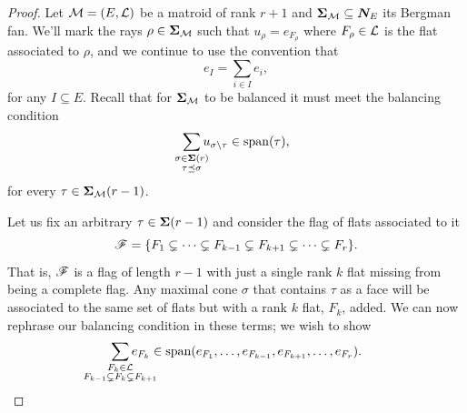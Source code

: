 \documentclass[12pt,oneside]{../../sfsuthesis}
\begin{document}
\begin{proof}
    Let \( \mathcal{M} = (E, \mathcal{L}) \) be a matroid of rank \( r + 1 \) and \( {\bm{\Sigma}}_{\mathcal{M}} \subseteq \bm{N}_E \) its Bergman fan.
    We'll mark the rays \( \rho \in {\bm{\Sigma}}_{\mathcal{M}} \) such that \( u_\rho = e_{F_\rho} \) where \( F_\rho \in \mathcal{L} \) is the flat associated to \( \rho \), and we continue to use the convention that
    \[
        e_{I} = \sum_{i \in I} e_i,
    \]
    for any \( I \subseteq E \).
    Recall that for \( {\bm{\Sigma}}_{\mathcal{M}} \) to be balanced it must meet the balancing condition
    \[
        \sum_{\mathclap{\substack{\sigma \in \bSigma(r) \\ \tau \preceq \sigma}}} u_{\sigma \setminus \tau} \in \Span(\tau),
    \]
    for every \( \tau \in {\bm{\Sigma}}_{\mathcal{M}}(r-1) \).

    Let us fix an arbitrary \( \tau \in {\bm{\Sigma}}(r-1) \) and consider the flag of flats associated to it
    \[
        \mathscr{F} = \{ F_1 \subsetneq \cdots \subsetneq F_{k-1} \subsetneq  F_{k+1} \subsetneq \cdots \subsetneq F_{r} \}.
    \]
    That is, \( \mathscr{F} \) is a flag of length \( r - 1 \) with just a single rank \( k \) flat missing from being a complete flag.
    Any maximal cone \( \sigma \) that contains \( \tau \) as a face will be associated to the same set of flats but with a rank \( k \) flat, \( F_{k} \), added.
    We can now rephrase our balancing condition in these terms; we wish to show
    \[
        \sum_{\mathclap{\substack{F_k \in \cL \\ F_{k-1} \subsetneq F_k \subsetneq F_{k+1} }}} e_{F_{k}} \in \Span(e_{F_1}, \dots, e_{F_{k-1}}, e_{F_{k+1}}, \dots, e_{F_r}).
    \]



\end{proof}
\end{document}
